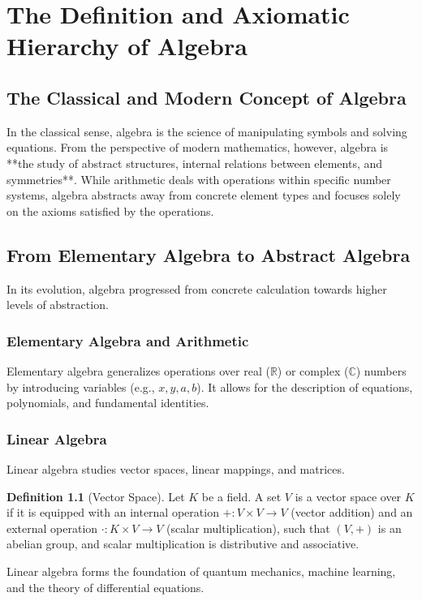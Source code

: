 \documentclass[11pt,a4paper,oneside]{book}
\theoremstyle{definition}
\newtheorem{definition}{Definition}[chapter]
\theoremstyle{plain}
\newcommand{\R}{\mathbb{R}}
\newcommand{\C}{\mathbb{C}}
\begin{document}
\tableofcontents

\mainmatter

\chapter{The Definition and Axiomatic Hierarchy of Algebra}

\section{The Classical and Modern Concept of Algebra}
In the classical sense, algebra is the science of manipulating symbols and solving equations. From the perspective of modern mathematics, however, algebra is **the study of abstract structures, internal relations between elements, and symmetries**. While arithmetic deals with operations within specific number systems, algebra abstracts away from concrete element types and focuses solely on the axioms satisfied by the operations.

\section{From Elementary Algebra to Abstract Algebra}
In its evolution, algebra progressed from concrete calculation towards higher levels of abstraction.

\subsection{Elementary Algebra and Arithmetic}
Elementary algebra generalizes operations over real ($\R$) or complex ($\C$) numbers by introducing variables (e.g., $x, y, a, b$). It allows for the description of equations, polynomials, and fundamental identities.

\subsection{Linear Algebra}
Linear algebra studies vector spaces, linear mappings, and matrices.
\begin{definition}[Vector Space]
Let $K$ be a field. A set $V$ is a vector space over $K$ if it is equipped with an internal operation $+: V \times V \to V$ (vector addition) and an external operation $\cdot: K \times V \to V$ (scalar multiplication), such that $(V, +)$ is an abelian group, and scalar multiplication is distributive and associative.
\end{definition}
Linear algebra forms the foundation of quantum mechanics, machine learning, and the theory of differential equations.
\end{document}
